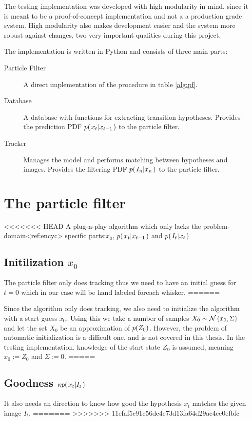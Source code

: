 The testing implementation was developed with high modularity in
mind, since it is meant to be a proof-of-concept implementation and
not a a production grade system. High modularity also makes
development easier and the system more robust against changes, two
very important qualities during this project.

The implementation is written in Python and consists of three main parts:
\begin{description}
  \item[Particle Filter] A direct  implementation of the procedure in
    table \ref{alg:pf}.
  \item[Database] A database with functions for extracting transition
    hypotheses. Provides the prediction PDF $p{(\left. x_t \middle\vert x_{t-1} \right.)}$ to the
    particle filter.
  \item[Tracker] Manages the model and performs matching between
    hypotheses and images. Provides the filtering PDF
    $p{(\left. I_n \middle\vert x_n \right.)}$ to the particle filter.
\end{description}

\section{The particle filter}
<<<<<<< HEAD
    A plug-n-play algorithm which only lacks the problem-domain<ref:encyc> specific parts:$x_0$, $p{(\left. x_t \middle\vert x_{t-1} \right.)}$ and $p{(\left. I_t \middle\vert x_t \right.)}$
    \subsection{Initilization $x_0$}
        The particle filter only does tracking thus we need to have an initial guess for $t=0$ which in our case will be hand labeled foreach whisker.
   ======

Since the algorithm only does tracking, we also need to initialize the algorithm with a start guess $x_0$. 
Using this we take a number of samples $X_0 \sim \mathcal{N}\left(x_0, \Sigma\right)$ and let the set $X_0$ be an approximation 
of $p{(Z_0)}$. However, the problem of automatic initialization is a difficult one\cite{Hedvig}, and is not covered in this thesis. 
In the testing implementation, knowledge of the start state $Z_0$ is assumed, meaning $x_0 := Z_0$ and $\Sigma := 0$.
=====
    
    \subsection{Goodness $\kappa p{(\left. x_t \middle\vert I_t \right.)}$}
        It also needs an direction to know how good the hypothesis $x_t$ matches the given image $I_t$.
=======
>>>>>>> 11efaf5c91c56de4e73d13fa64d29ac4ce0efbfc

